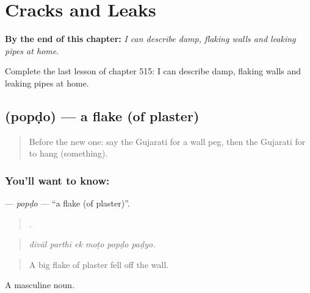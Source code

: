 
\chapter{Cracks and Leaks}
\label{ch:gu-cracks-and-leaks}

\begin{chapteropening}
\textbf{By the end of this chapter:} \emph{I can describe damp, flaking walls and leaking pipes at home.}

Complete the last lesson of chapter 515: I can describe damp, flaking walls and leaking pipes at home.
\end{chapteropening}

\section[\texorpdfstring{\gu{પોપડો} (popḍo)}{પોપડો (popḍo)}]{ (popḍo) — a flake (of plaster)}

\label{lesson:GU-C515-popdo}



\begin{quote}
Before the new one: say the Gujarati for a wall peg, then the Gujarati for to hang (something).
\end{quote}

\subsection*{You'll want to know: }
\textbf{} — \emph{popḍo} — \textquotedblleft{}a flake (of plaster)\textquotedblright{}.

\begin{quote}
     .
\end{quote}

\begin{quote}
\emph{dīvāl parthī ek moṭo popḍo paḍyo.}
\end{quote}

\begin{quote}
A big flake of plaster fell off the wall.
\end{quote}

A masculine noun.


